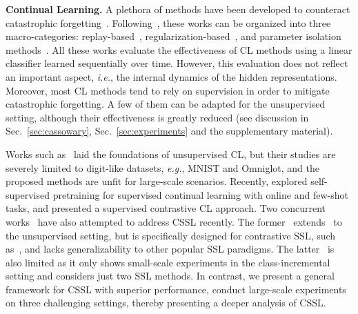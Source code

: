 \noindent\textbf{Continual Learning.} A plethora of methods have been developed to counteract catastrophic forgetting~\cite{kirkpatrick2017overcoming, Rusu16progressive, shin2017continual, Lopez-Paz17, Chaudhry19, serra2018overcoming, chaudhry2018riemannian, Aljundi17, Zenke17, buzzega2020dark, fini2020online, douillard2020podnet, wu2019large, castro2018end, rebuffi2017icarl, hou2019learning, prabhu2020gdumb, Li17learning, ostapenko2019learning, cha2021co2l, Robins95}. Following~\cite{de2019continual}, these works can be organized into three macro-categories: replay-based~\cite{ostapenko2019learning, Robins95, rebuffi2017icarl, buzzega2020dark, Chaudhry19, Lopez-Paz17}, regularization-based~\cite{fini2020online, Li17learning, shin2017continual, kirkpatrick2017overcoming, Zenke17, Aljundi17, castro2018end, douillard2020podnet, hou2019learning, chaudhry2018riemannian, wu2019large, cha2021co2l}, and parameter isolation
methods~\cite{Rusu16progressive, serra2018overcoming}. All these works evaluate the effectiveness of CL methods using a linear classifier learned
sequentially over time. However, this evaluation does not reflect an important aspect, \textit{i.e.}, the internal dynamics of the hidden representations. Moreover, most CL methods tend to rely on supervision in order to mitigate catastrophic forgetting. A few of them can be adapted for the unsupervised setting, although their effectiveness is greatly reduced (see discussion in Sec.~\ref{sec:cassowary}, Sec.~\ref{sec:experiments} and the supplementary material). 

Works such as~\cite{rao2019continual, achille2018life, smith2019unsupervised} laid the foundations of unsupervised CL, but their studies are severely limited to digit-like datasets, \emph{e.g.}, MNIST and Omniglot, and the proposed methods are unfit for large-scale scenarios. Recently, \cite{gallardo2021self, caccia2021special} explored self-supervised pretraining for supervised continual learning with online and few-shot tasks, and \cite{cha2021co2l} presented a supervised contrastive CL approach. Two concurrent works~\cite{lin2021continual, madaan2021rethinking} have also attempted to address CSSL recently. The former~\cite{lin2021continual} extends~\cite{cha2021co2l} to the unsupervised setting, but is specifically designed for contrastive SSL, such as~\cite{chen2020simple,he2020momentum}, and lacks generalizability to other popular SSL paradigms. The latter~\cite{madaan2021rethinking} is also limited as it only shows small-scale experiments in the class-incremental setting and considers just two SSL methods. In contrast, we present a general framework for CSSL with superior performance, conduct large-scale experiments on three challenging settings, thereby presenting a deeper analysis of CSSL.